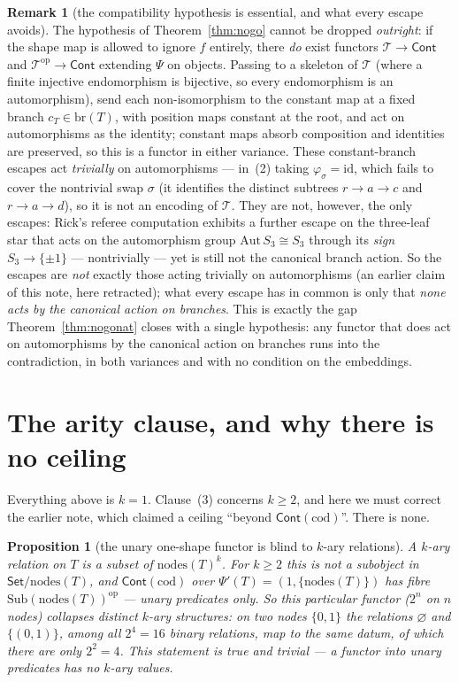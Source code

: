 \documentclass[11pt]{article}
\newtheorem{proposition}[theorem]{Proposition}
\theoremstyle{definition}
\newtheorem{remark}[theorem]{Remark}
\newcommand{\Set}{\mathsf{Set}}
\newcommand{\Cont}{\mathsf{Cont}}
\newcommand{\Sub}{\mathrm{Sub}}
\newcommand{\cod}{\mathrm{cod}}
\newcommand{\nodes}{\mathrm{nodes}}
\newcommand{\branches}{\mathrm{br}}
\newcommand{\id}{\mathrm{id}}
\newcommand{\op}{\mathrm{op}}
\newcommand{\Tree}{\mathcal{T}}
\newcommand{\Psip}{\Psi'}
\begin{document}
\begin{remark}[the compatibility hypothesis is essential, and what every escape avoids]\label{rem:dropcompat}
The hypothesis of Theorem~\ref{thm:nogo} cannot be dropped \emph{outright}: if the shape map is
allowed to ignore $f$ entirely, there \emph{do} exist functors $\Tree\to\Cont$ and
$\Tree^\op\to\Cont$ extending $\Psi$ on objects. Passing to a skeleton of $\Tree$ (where a finite
injective endomorphism is bijective, so every endomorphism is an automorphism), send each
non-isomorphism to the constant map at a fixed branch $c_T\in\branches(T)$, with position maps
constant at the root, and act on automorphisms as the identity; constant maps absorb composition and
identities are preserved, so this is a functor in either variance. These constant-branch escapes act
\emph{trivially} on automorphisms --- in~(2) taking $\varphi_\sigma=\id$, which fails to cover the
nontrivial swap $\sigma$ (it identifies the distinct subtrees $r\to a\to c$ and $r\to a\to d$), so it
is not an encoding of $\Tree$. They are not, however, the only escapes: Rick's referee computation
exhibits a further escape on the three-leaf star that acts on the automorphism group
$\mathrm{Aut}\,S_3\cong S_3$ through its \emph{sign} $S_3\to\{\pm1\}$ --- nontrivially --- yet is
still not the canonical branch action. So the escapes are \emph{not} exactly those acting trivially on
automorphisms (an earlier claim of this note, here retracted); what every escape has in common is only
that \emph{none acts by the canonical action on branches}. This is exactly the gap
Theorem~\ref{thm:nogonat} closes with a single hypothesis: any functor that does act on automorphisms
by the canonical action on branches runs into the contradiction, in both variances and with no
condition on the embeddings.
\end{remark}

\section{The arity clause, and why there is no ceiling}\label{sec:arity}

Everything above is $k=1$. Clause~(3) concerns $k\ge2$, and here we must correct the earlier note,
which claimed a ceiling ``beyond $\Cont(\cod)$''. There is none.

\begin{proposition}[the unary one-shape functor is blind to $k$-ary relations]\label{prop:arity}
A $k$-ary relation on $T$ is a subset of $\nodes(T)^k$. For $k\ge2$ this is not a subobject in
$\Set/\nodes(T)$, and $\Cont(\cod)$ over $\Psip(T)=(1,\{\nodes(T)\})$ has fibre $\Sub(\nodes(T))^\op$
--- unary predicates only. So this particular functor ($2^n$ on $n$ nodes) collapses distinct
$k$-ary structures: on two nodes $\{0,1\}$ the relations $\varnothing$ and $\{(0,1)\}$, among all
$2^4=16$ binary relations, map to the same datum, of which there are only $2^2=4$. This statement is
true and \emph{trivial} --- a functor into unary predicates has no $k$-ary values.
\end{proposition}
\end{document}
